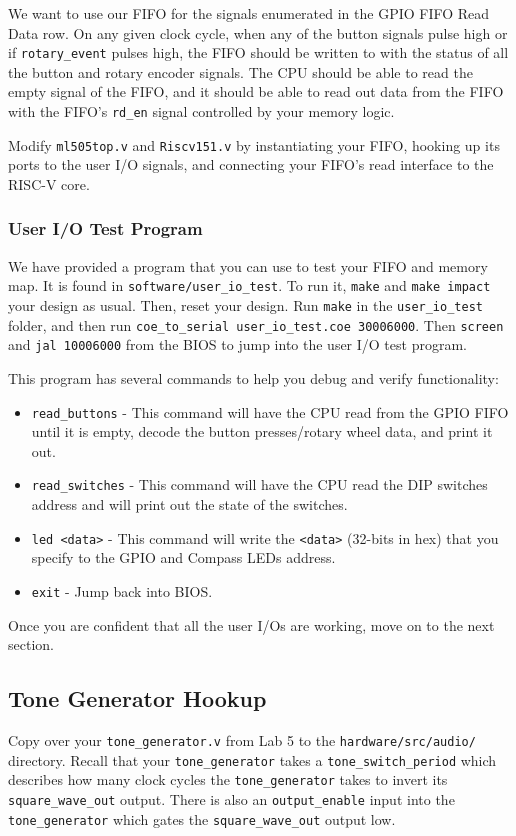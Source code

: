 \documentclass[11pt]{article}
\begin{document}
We want to use our FIFO for the signals enumerated in the GPIO FIFO Read Data row. On any given clock cycle, when any of the button signals pulse high or if \verb|rotary_event| pulses high, the FIFO should be written to with the status of all the button and rotary encoder signals. The CPU should be able to read the empty signal of the FIFO, and it should be able to read out data from the FIFO with the FIFO's \verb|rd_en| signal controlled by your memory logic.

Modify \verb|ml505top.v| and \verb|Riscv151.v| by instantiating your FIFO, hooking up its ports to the user I/O signals, and connecting your FIFO's read interface to the RISC-V core.

\subsubsection{User I/O Test Program}
We have provided a program that you can use to test your FIFO and memory map. It is found in \verb|software/user_io_test|. To run it, \verb|make| and \verb|make impact| your design as usual. Then, reset your design. Run \verb|make| in the \verb|user_io_test| folder, and then run \verb|coe_to_serial user_io_test.coe 30006000|. Then \verb|screen| and \verb|jal 10006000| from the BIOS to jump into the user I/O test program.

This program has several commands to help you debug and verify functionality:
\begin{itemize}
	\item \verb|read_buttons| - This command will have the CPU read from the GPIO FIFO until it is empty, decode the button presses/rotary wheel data, and print it out.
	\item \verb|read_switches| - This command will have the CPU read the DIP switches address and will print out the state of the switches.
	\item \verb|led <data>| - This command will write the \verb|<data>| (32-bits in hex) that you specify to the GPIO and Compass LEDs address.
	\item \verb|exit| - Jump back into BIOS.
\end{itemize}

Once you are confident that all the user I/Os are working, move on to the next section.

\subsection{Tone Generator Hookup}
Copy over your \verb|tone_generator.v| from Lab 5 to the \verb|hardware/src/audio/| directory. Recall that your \verb|tone_generator| takes a \verb|tone_switch_period| which describes how many clock cycles the \verb|tone_generator| takes to invert its \verb|square_wave_out| output. There is also an \verb|output_enable| input into the \verb|tone_generator| which gates the \verb|square_wave_out| output low.
\end{document}
